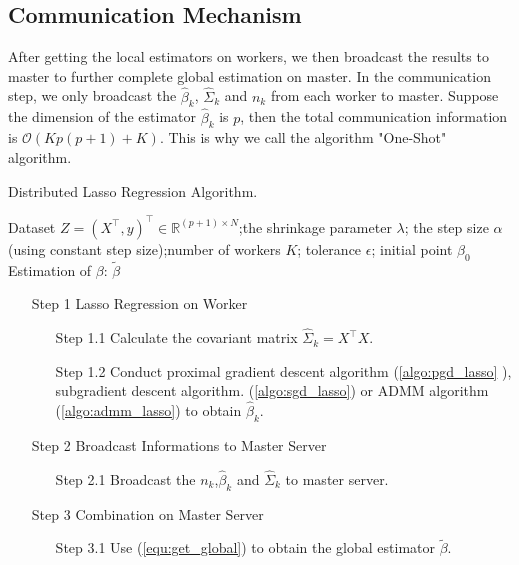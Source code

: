 \documentclass[11pt,en,authoryear]{elegantpaper}
\numberwithin{equation}{section}
\newcommand{\mbR}{\mathbb{R}}
\begin{document}
\subsection{Communication Mechanism}

After getting the local estimators on workers, we then broadcast the results to master to further complete global estimation on master. In the communication step, we only broadcast the $\hat{\beta}_k$, $\hat{\Sigma}_k$ and $n_k$ from each worker to master. Suppose the dimension of the estimator $\hat{\beta}_k$ is $p$, then the total communication information is $\mathcal{O}\left(Kp(p+1) +K\right)$. This is why we call the algorithm "One-Shot" algorithm.

\begin{center}
\begin{minipage}{13.5cm}
	  \begin{algorithm}[H]
  \caption{Distributed Lasso Regression Algorithm.}\label{algo:dlr}
  \begin{algorithmic}[1]
    \Require
      Dataset $Z = (X^{\top}, y)^{\top} \in \mbR^{(p+1) \times N}$;the shrinkage parameter $\lambda$;  the step size $\alpha$ (using constant step size);number of workers $K$; tolerance $\epsilon$; initial point $\beta_0$
    \Ensure Estimation of $\beta$: $\tilde{\beta}$
        \begin{itemize}
        \item [{\sc Step 1}] {\sc Lasso Regression on Worker}
        \begin{itemize}
      \item [{\sc Step 1.1}] Calculate the covariant matrix $\hat{\Sigma}_k = X^{\top}X$.
      \item [{\sc Step 1.2}] {Conduct proximal gradient descent algorithm (\ref{algo:pgd_lasso} ), subgradient descent algorithm. (\ref{algo:sgd_lasso}) or ADMM algorithm (\ref{algo:admm_lasso})} to obtain $\hat{\beta}_k$.
     \end{itemize}
     \end{itemize}
    \begin{itemize}
        \item [{\sc Step 2}] {\sc Broadcast Informations to Master Server}
        \begin{itemize}
      \item [{\sc Step 2.1}] Broadcast the $n_k$,$\hat{\beta}_k$ and $\hat{\Sigma}_k$ to master server.
       \end{itemize}
    \end{itemize}
    \begin{itemize}
        \item [{\sc Step 3}] {\sc Combination on Master Server}
        \begin{itemize}
      \item [{\sc Step 3.1}] Use (\ref{equ:get_global}) to obtain the global estimator $\tilde{\beta}$.
       \end{itemize}
    \end{itemize}
  \end{algorithmic}
\end{algorithm}
\end{minipage}
\end{center}
\end{document}
